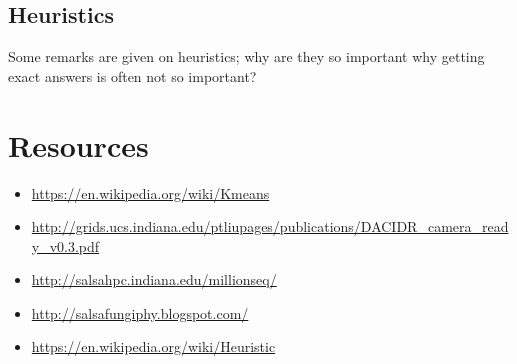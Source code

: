 \subsection{Heuristics}\label{heuristics}

Some remarks are given on heuristics; why are they so important why
getting exact answers is often not so important?


\section{Resources}

\begin{itemize}

\item
  \url{https://en.wikipedia.org/wiki/Kmeans}
\item
  \url{http://grids.ucs.indiana.edu/ptliupages/publications/DACIDR_camera_ready_v0.3.pdf}
\item
  \url{http://salsahpc.indiana.edu/millionseq/}
\item
  \url{http://salsafungiphy.blogspot.com/}
\item
  \url{https://en.wikipedia.org/wiki/Heuristic}
\end{itemize}
